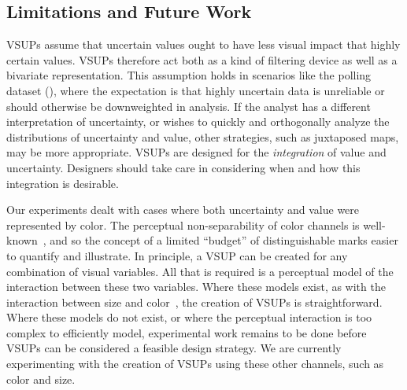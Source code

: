 
\subsection{Limitations and Future Work}

VSUPs assume that uncertain values ought to have less visual impact that highly certain values. VSUPs therefore act both as a kind of filtering device as well as a bivariate representation. This assumption holds in scenarios like the polling dataset (), where the expectation is that highly uncertain data is unreliable or should otherwise be downweighted in analysis. If the analyst has a different interpretation of uncertainty, or wishes to quickly and orthogonally analyze the distributions of uncertainty and value, other strategies, such as juxtaposed maps, may be more appropriate. VSUPs are designed for the \emph{integration} of value and uncertainty. Designers should take care in considering when and how this integration is desirable.

Our experiments dealt with cases where both uncertainty and value were represented by color. The perceptual non-separability of color channels is well-known~\cite{garner1970integrality, ware2012information}, and so the concept of a limited ``budget'' of distinguishable marks easier to quantify and illustrate. In principle, a VSUP can be created for any combination of visual variables. All that is required is a perceptual model of the interaction between these two variables. Where these models exist, as with the interaction between size and color~\cite{stone2014engineering}, the creation of VSUPs is straightforward. Where these models do not exist, or where the perceptual interaction is too complex to efficiently model, experimental work remains to be done before VSUPs can be considered a feasible design strategy. We are currently experimenting with the creation of VSUPs using these other channels, such as color and size.

